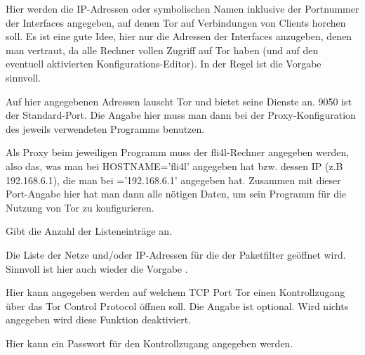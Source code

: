 \begin{description}



        {Hier werden die IP-Adressen oder symbolischen Namen inklusive
        der Portnummer der Interfaces angegeben, auf denen Tor auf
        Verbindungen von Clients horchen soll. Es ist eine gute Idee,
        hier nur die Adressen der Interfaces anzugeben, denen man
        vertraut, da alle Rechner vollen Zugriff auf Tor haben
        (und auf den eventuell aktivierten Konfigurations-Editor). In
        der Regel ist die Vorgabe 
        sinnvoll.

        Auf hier angegebenen Adressen lauscht Tor und bietet seine
        Dienste an.  9050 ist der Standard-Port. Die Angabe hier muss
        man dann bei der Proxy-Konfiguration des jeweils verwendeten
        Programms benutzen.

        Als Proxy beim jeweiligen Programm muss der fli4l-Rechner
        angegeben werden, also das, was man bei HOSTNAME='fli4l'
        angegeben hat bzw.  dessen IP (z.B 192.168.6.1), die man bei
        ='192.168.6.1' angegeben hat. Zusammen
        mit dieser Port-Angabe hier hat man dann alle nötigen Daten,
        um sein Programm für die Nutzung von Tor zu
        konfigurieren.}


        {Gibt die Anzahl der Listeneinträge an.}


        Die Liste der Netze und/oder IP-Adressen für die der
        Paketfilter geöffnet wird. Sinnvoll ist hier auch wieder die
        Vorgabe .


        Hier kann angegeben werden auf welchem TCP Port Tor einen
        Kontrollzugang über das Tor Control Protocol öffnen soll.
        Die Angabe ist optional. Wird nichts angegeben wird diese
        Funktion deaktiviert.


        Hier kann ein Passwort für den Kontrollzugang angegeben werden.


\end{description}
